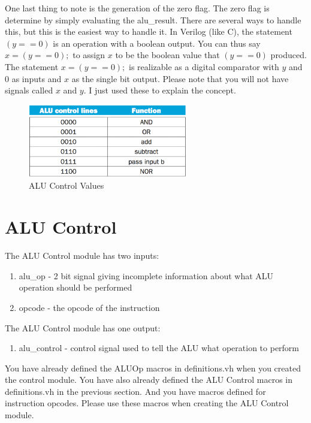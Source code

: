 One last thing to note is the generation of the zero flag.  The zero flag is determine by simply evaluating the alu\_result.  There are several ways to handle this, but this is the easiest way to handle it.  In Verilog (like C), the statement $(y==0)$ is an operation with a boolean output.  You can thus say $x=(y==0);$ to assign $x$ to be the boolean value that $(y==0)$ produced.  The statement $x=(y==0);$ is realizable as a digital comparator with $y$ and $0$ as inputs and $x$ as the single bit output.  Please note that you will not have signals called $x$ and $y$.  I just used these to explain the concept.

\begin{figure}
	\caption{ALU Control Values}\label{fig:alu_control_table}
	\begin{center}
		\includegraphics[width=2.75in]{../images/alu_control_table.png}
	\end{center}
\end{figure} 

\section{ALU Control}
The ALU Control module has two inputs:
\begin{enumerate}
	\item alu\_op - 2 bit signal giving incomplete information about what ALU operation should be performed
	\item opcode - the opcode of the instruction
\end{enumerate}
The ALU Control module has one output:
\begin{enumerate}
	\item alu\_control - control signal used to tell the ALU what operation to perform
\end{enumerate}
You have already defined the ALUOp macros in definitions.vh when you created the control module.  You have also already defined the ALU Control macros in definitions.vh in the previous section.  And you have macros defined for instruction opcodes. Please use these macros when creating the ALU Control module.

